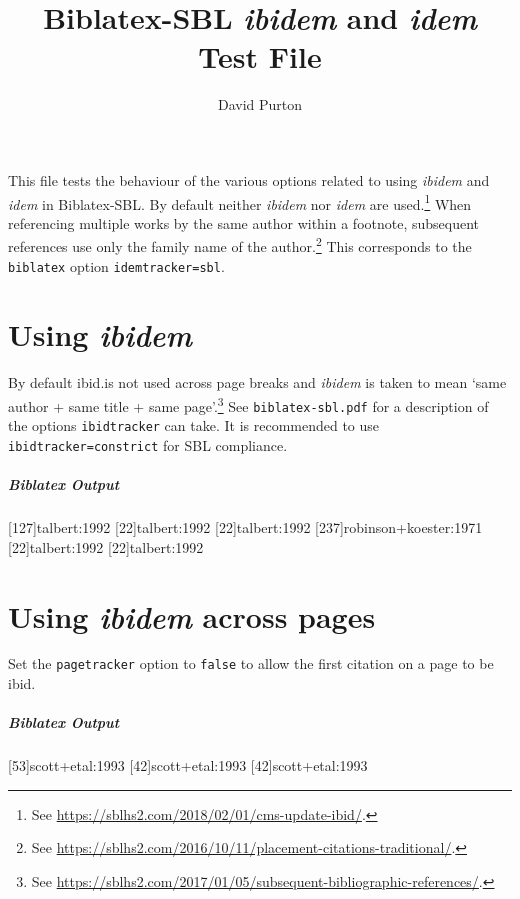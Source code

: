\documentclass[a4paper]{article}
\title{Biblatex-SBL \emph{ibidem} and \emph{idem} Test File}
\author{David Purton}
\date{}
\newenvironment{biboutput}{%
  \subparagraph{Biblatex Output}
}{\color{black}}
\begin{document}
\maketitle

This file tests the behaviour of the various options related to using
\emph{ibidem} and \emph{idem} in Biblatex-SBL. By default neither
\emph{ibidem} nor \emph{idem} are used.\footnote{See
\url{https://sblhs2.com/2018/02/01/cms-update-ibid/}.} When referencing
multiple works by the same author within a footnote, subsequent references use
only the family name of the author.\footnote{See
\url{https://sblhs2.com/2016/10/11/placement-citations-traditional/}.} This
corresponds to the \verb|biblatex| option \verb|idemtracker=sbl|.

\section*{Using \emph{ibidem}}

By default ibid.\@ is not used across page breaks and \emph{ibidem} is taken
to mean ‘same author + same title + same page’.\footnote{See
\url{https://sblhs2.com/2017/01/05/subsequent-bibliographic-references/}.} See
\texttt{biblatex-sbl.pdf} for a description of the options
\texttt{ibidtracker} can take. It is recommended to use
\verb|ibidtracker=constrict| for SBL compliance.

\begin{biboutput}
  [127]{talbert:1992}
  [22]{talbert:1992}
  [22]{talbert:1992}
  [237]{robinson+koester:1971}
  [22]{talbert:1992}
  \clearpage
  [22]{talbert:1992}
\end{biboutput}

\section*{Using \emph{ibidem} across pages}

Set the \texttt{pagetracker} option to \texttt{false} to allow the first
citation on a page to be ibid. 


\begin{biboutput}
  [53]{scott+etal:1993}
  [42]{scott+etal:1993}
  \clearpage
  [42]{scott+etal:1993}
\end{biboutput}
\end{document}

